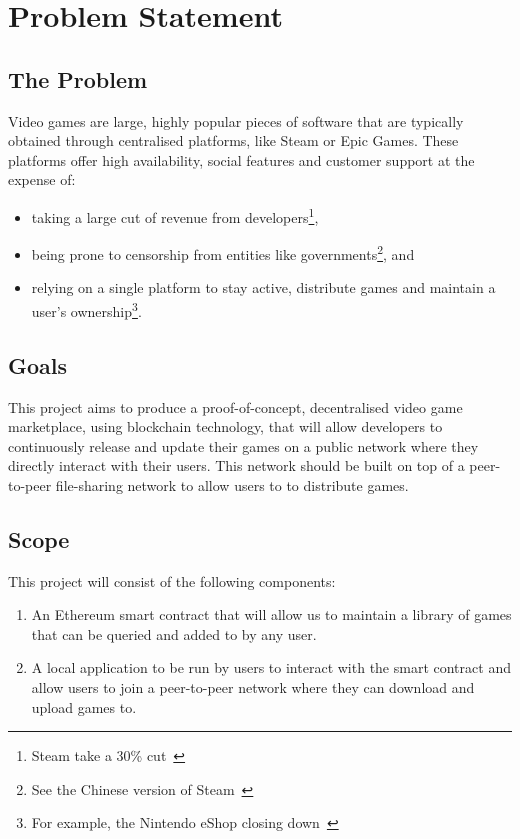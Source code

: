 
\chapter{Problem Statement}

\section{The Problem}\label{sec:problem}

Video games are large, highly popular pieces of software that are typically obtained through centralised platforms, like Steam or Epic Games. These platforms offer high availability, social features and customer support at the expense of:

\begin{itemize}
  \item taking a large cut of revenue from developers\footnote{Steam take a 30\% cut~\cite{marks_report_2019,brown_valve_2021}},
  \item being prone to censorship from entities like governments\footnote{See the Chinese version of Steam~\cite{noauthor_steam_nodate-1}}, and
  \item relying on a single platform to stay active, distribute games and maintain a user's ownership\footnote{For example, the Nintendo eShop closing down~\cite{noauthor_nintendo_2022}}.
\end{itemize}

\section{Goals}

This project aims to produce a proof-of-concept, decentralised video game marketplace, using blockchain technology, that will allow developers to continuously release and update their games on a public network where they directly interact with their users. This network should be built on top of a peer-to-peer file-sharing network to allow users to to distribute games.

\section{Scope}

This project will consist of the following components:

\begin{enumerate}
  \item An Ethereum smart contract that will allow us to maintain a library of games that can be queried and added to by any user.
  \item A local application to be run by users to interact with the smart contract and allow users to join a peer-to-peer network where they can download and upload games to.
\end{enumerate}